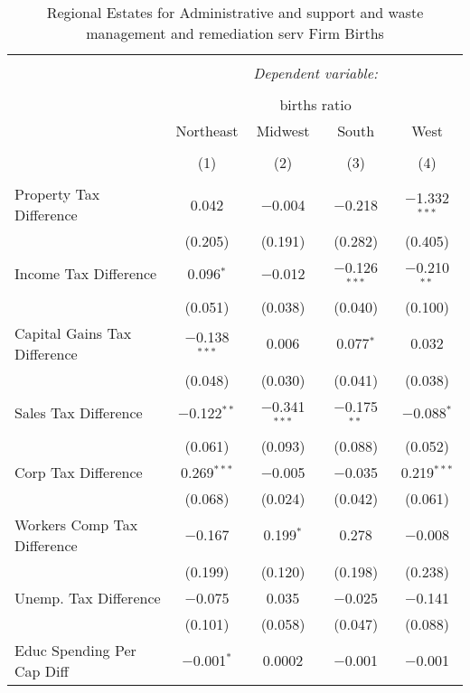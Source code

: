 
\begin{table}[!htbp] \centering 
  \caption{Regional Estates for  Administrative and support and waste management and remediation serv Firm Births} 
  \label{} 
\begin{tabular}{@{\extracolsep{5pt}}lcccc} 
\\[-1.8ex]\hline 
\hline \\[-1.8ex] 
 & \multicolumn{4}{c}{\textit{Dependent variable:}} \\ 
\cline{2-5} 
\\[-1.8ex] & \multicolumn{4}{c}{births ratio} \\ 
 & Northeast & Midwest & South & West \\ 
\\[-1.8ex] & (1) & (2) & (3) & (4)\\ 
\hline \\[-1.8ex] 
 Property Tax Difference & 0.042 & $-$0.004 & $-$0.218 & $-$1.332$^{***}$ \\ 
  & (0.205) & (0.191) & (0.282) & (0.405) \\ 
  Income Tax Difference & 0.096$^{*}$ & $-$0.012 & $-$0.126$^{***}$ & $-$0.210$^{**}$ \\ 
  & (0.051) & (0.038) & (0.040) & (0.100) \\ 
  Capital Gains Tax Difference & $-$0.138$^{***}$ & 0.006 & 0.077$^{*}$ & 0.032 \\ 
  & (0.048) & (0.030) & (0.041) & (0.038) \\ 
  Sales Tax Difference & $-$0.122$^{**}$ & $-$0.341$^{***}$ & $-$0.175$^{**}$ & $-$0.088$^{*}$ \\ 
  & (0.061) & (0.093) & (0.088) & (0.052) \\ 
  Corp Tax Difference & 0.269$^{***}$ & $-$0.005 & $-$0.035 & 0.219$^{***}$ \\ 
  & (0.068) & (0.024) & (0.042) & (0.061) \\ 
  Workers Comp Tax Difference & $-$0.167 & 0.199$^{*}$ & 0.278 & $-$0.008 \\ 
  & (0.199) & (0.120) & (0.198) & (0.238) \\ 
  Unemp. Tax Difference & $-$0.075 & 0.035 & $-$0.025 & $-$0.141 \\ 
  & (0.101) & (0.058) & (0.047) & (0.088) \\ 
  Educ Spending Per Cap Diff & $-$0.001$^{*}$ & 0.0002 & $-$0.001 & $-$0.001 \\ 

\end{tabular}
\end{table}
